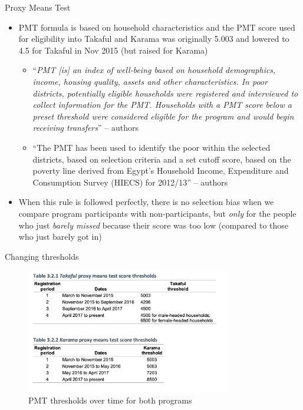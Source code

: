 \documentclass{beamer}
\begin{document}
\begin{frame}{Proxy Means Test}
\begin{itemize}
\item PMT formula is based on household characteristics and the PMT score used for eligibility into Takaful and Karama was originally 5.003 and lowered to 4.5 for Takaful in Nov 2015 (but raised for Karama)
	\begin{itemize}
	\tiny
\item ``\emph{PMT [is] an index of well-being based on household demographics, income,
housing quality, assets and other characteristics. In poor districts, potentially eligible households
were registered and interviewed to collect information for the PMT. Households with a PMT score
below a preset threshold were considered eligible for the program and would begin receiving
transfers}'' -- authors
\item ``The PMT has been used to identify
the poor within the selected districts, based on selection criteria and a set cutoff score, based on the
poverty line derived from Egypt’s Household Income, Expenditure and Consumption Survey (HIECS)
for 2012/13'' -- authors
	\end{itemize}
\item When this rule is followed perfectly, there is no selection bias when we compare program participants with non-participants, but \emph{only} for the people who just \emph{barely missed} because their score was too low (compared to those who just barely got in)
\end{itemize}
\end{frame}


\begin{frame}{Changing thresholds}
    \begin{figure}
        \centering
        \includegraphics[width=0.8\textwidth]{./lecture_includes/takaful_table1.png}
        \caption{PMT thresholds over time for both programs}
    \end{figure}
\end{frame}
\end{document}
